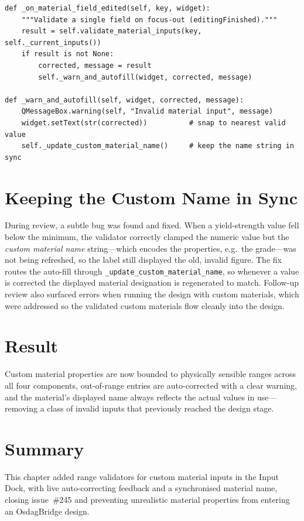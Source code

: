 \begin{lstlisting}[caption={Live per-field validation and auto-fill (\texttt{material\_properties.py}).},label={lst:matdialog}]
def _on_material_field_edited(self, key, widget):
    """Validate a single field on focus-out (editingFinished)."""
    result = self.validate_material_inputs(key, self._current_inputs())
    if result is not None:
        corrected, message = result
        self._warn_and_autofill(widget, corrected, message)

def _warn_and_autofill(self, widget, corrected, message):
    QMessageBox.warning(self, "Invalid material input", message)
    widget.setText(str(corrected))          # snap to nearest valid value
    self._update_custom_material_name()     # keep the name string in sync
\end{lstlisting}

\section{Keeping the Custom Name in Sync}
During review, a subtle bug was found and fixed. When a yield-strength value fell below the
minimum, the validator correctly clamped the numeric value but the \emph{custom material name}
string---which encodes the properties, e.g.\ the grade---was not being refreshed, so the label
still displayed the old, invalid figure. The fix routes the auto-fill through
\texttt{\_update\_custom\_material\_name}, so whenever a value is corrected the displayed
material designation is regenerated to match. Follow-up review also surfaced errors when running
the design with custom materials, which were addressed so the validated custom materials flow
cleanly into the design.

\section{Result}
Custom material properties are now bounded to physically sensible ranges across all four
components, out-of-range entries are auto-corrected with a clear warning, and the material's
displayed name always reflects the actual values in use---removing a class of invalid inputs
that previously reached the design stage.


\section{Summary}
This chapter added range validators for custom material inputs in the Input Dock, with live
auto-correcting feedback and a synchronised material name, closing issue~\#245 and preventing
unrealistic material properties from entering an OsdagBridge design.
